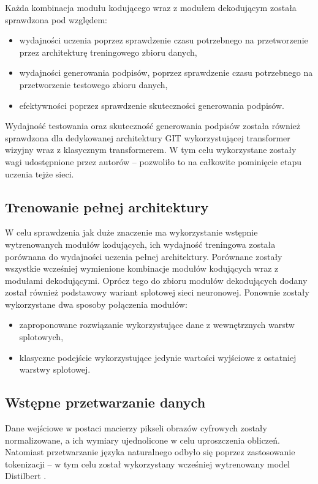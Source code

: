 Każda kombinacja modułu kodującego wraz z modułem dekodującym została sprawdzona pod względem:
\begin{itemize}
    \item wydajności uczenia poprzez sprawdzenie czasu potrzebnego na przetworzenie przez architekturę treningowego zbioru danych,
    \item wydajności generowania podpisów, poprzez sprawdzenie czasu potrzebnego na przetworzenie testowego zbioru danych,
    \item efektywności poprzez sprawdzenie skuteczności generowania podpisów.
\end{itemize}
Wydajność testowania oraz skuteczność generowania podpisów została również sprawdzona dla dedykowanej architektury GIT \cite{wang2022git} wykorzystującej transformer wizyjny wraz z klasycznym transformerem. W tym celu wykorzystane zostały wagi udostępnione przez autorów -- pozwoliło to na całkowite pominięcie etapu uczenia tejże sieci.
\subsection{Trenowanie pełnej architektury}
W celu sprawdzenia jak duże znaczenie ma wykorzystanie wstępnie wytrenowanych modułów kodujących, ich wydajność treningowa została porównana do wydajności uczenia pełnej architektury. Porównane zostały wszystkie wcześniej wymienione kombinacje modułów kodujących wraz z modułami dekodującymi. Oprócz tego do zbioru modułów dekodujących dodany został również podstawowy wariant splotowej sieci neuronowej. Ponownie zostały wykorzystane dwa sposoby połączenia modułów: \begin{itemize}
    \item zaproponowane rozwiązanie wykorzystujące dane z wewnętrznych warstw splotowych,
    \item klasyczne podejście wykorzystujące jedynie wartości wyjściowe z ostatniej warstwy splotowej.
\end{itemize}
\subsection{Wstępne przetwarzanie danych}
Dane wejściowe w postaci macierzy pikseli obrazów cyfrowych zostały normalizowane, a ich wymiary ujednolicone w celu uproszczenia obliczeń. Natomiast przetwarzanie języka naturalnego odbyło się poprzez zastosowanie tokenizacji -- w tym celu został wykorzystany wcześniej wytrenowany model Distilbert \cite{distilbert}.
